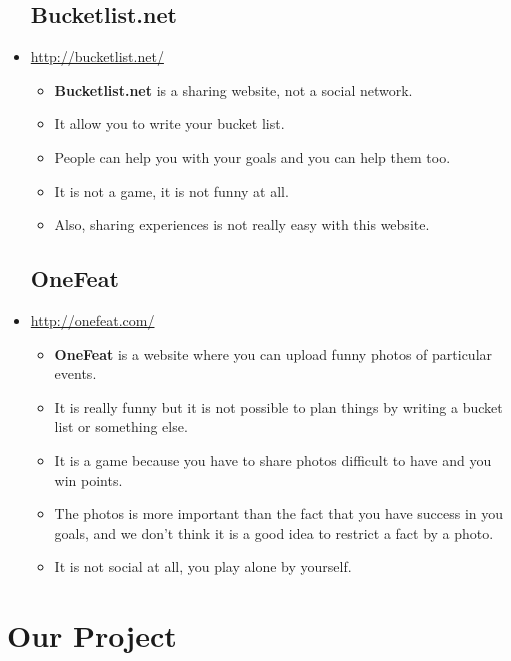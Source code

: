 \documentclass{life-en}
\begin{document}
\begin{itemize}
      \section{Bucketlist.net}

    \item \url{http://bucketlist.net/}\\
      \begin{itemize}
        \item \textbf{Bucketlist.net} is a sharing website, not a social network.
        \item It allow you to write your bucket list.
        \item People can help you with your goals and you can help them too.
        \item It is not a game, it is not funny at all.
        \item Also, sharing experiences is not really easy with this website.
      \end{itemize}

      \section{OneFeat}

    \item \url{http://onefeat.com/}\\
      \begin{itemize}
        \item \textbf{OneFeat} is a website where you can upload funny photos of particular events.
        \item It is really funny but it is not possible to plan things by writing a bucket list or something else.
        \item It is a game because you have to share photos difficult to have and you win points.
        \item The photos is more important than the fact that you have success in you goals, and we don’t think it is a good idea to restrict a fact by a photo.
        \item It is not social at all, you play alone by yourself.
      \end{itemize}

\end{itemize}


\chapter{Our Project}
\end{document}
